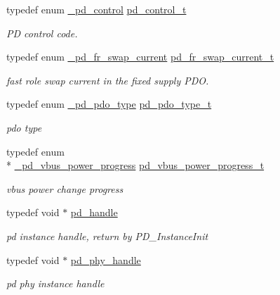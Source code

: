 \begin{DoxyCompactItemize}
typedef enum \hyperlink{group__usb__pd__stack_ga0edd2a390d28d96646bc71aac1858af1}{\-\_\-pd\-\_\-control} \hyperlink{group__usb__pd__stack_ga880e41e7aafed69c34035517d1bbb7b6}{pd\-\_\-control\-\_\-t}
\begin{DoxyCompactList}\small\item\em P\-D control code. \end{DoxyCompactList}\item 
typedef enum \hyperlink{group__usb__pd__stack_ga2cce3e21dbed22affd462b139a25889f}{\-\_\-pd\-\_\-fr\-\_\-swap\-\_\-current} \hyperlink{group__usb__pd__stack_gaed8d775bac19feb90ff7a857e9768366}{pd\-\_\-fr\-\_\-swap\-\_\-current\-\_\-t}
\begin{DoxyCompactList}\small\item\em fast role swap current in the fixed supply P\-D\-O. \end{DoxyCompactList}\item 
typedef enum \hyperlink{group__usb__pd__stack_gab9f5d08f382b92b55a7f5f224a231dc9}{\-\_\-pd\-\_\-pdo\-\_\-type} \hyperlink{group__usb__pd__stack_ga1ed8c8629c16f0246f723f164abfe7d4}{pd\-\_\-pdo\-\_\-type\-\_\-t}
\begin{DoxyCompactList}\small\item\em pdo type \end{DoxyCompactList}\item 
typedef enum \\*
\hyperlink{group__usb__pd__stack_ga1af9af0106a9413093f8e0d9b796771b}{\-\_\-pd\-\_\-vbus\-\_\-power\-\_\-progress} \hyperlink{group__usb__pd__stack_ga9fe9a91f20a573620c9cc1263d7c77e4}{pd\-\_\-vbus\-\_\-power\-\_\-progress\-\_\-t}
\begin{DoxyCompactList}\small\item\em vbus power change progress \end{DoxyCompactList}\item 
typedef void $\ast$ \hyperlink{group__usb__pd__stack_ga9397835347d48ef48b6b0ecba6312213}{pd\-\_\-handle}
\begin{DoxyCompactList}\small\item\em pd instance handle, return by P\-D\-\_\-\-Instance\-Init \end{DoxyCompactList}\item 
typedef void $\ast$ \hyperlink{group__usb__pd__stack_gab39e13c5c0808b2fe22b7dac49db335a}{pd\-\_\-phy\-\_\-handle}
\begin{DoxyCompactList}\small\item\em pd phy instance handle \end{DoxyCompactList}\item 

\end{DoxyCompactItemize}
